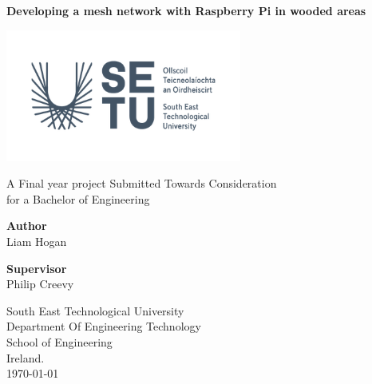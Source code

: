 \thispagestyle{empty}

\begin{center}
	\begin{LARGE}
		\textbf{Developing a mesh network with Raspberry Pi in wooded areas} \\
	
	\end{LARGE}

\vspace{40pt}

\begin{center}
	\includegraphics[width=220pt]{Images/SETU_Ireland_logo.png}
\end{center}

\vspace{50pt}

A Final year project Submitted Towards Consideration \\
for a Bachelor of Engineering \\

\vspace{60pt}

\textbf{Author} \\
Liam Hogan \\

\vspace{40pt}

\textbf{Supervisor} \\
Philip Creevy \\

\vspace{30pt}

South East Technological University \\
Department Of Engineering Technology \\
School of Engineering \\
Ireland. \\
\today
\end{center}
